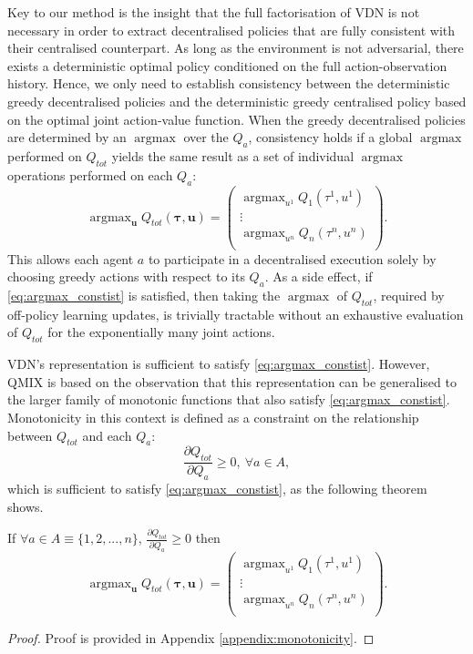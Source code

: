 \documentclass[twoside,11pt]{article}
\DeclareMathOperator*{\argmax}{argmax}
\begin{document}
Key to our method is the insight that the full factorisation of VDN is not 
necessary in order to extract decentralised policies that are fully 
consistent with their centralised counterpart.
As long as the environment is not adversarial, there exists a deterministic optimal policy conditioned 
on the full action-observation history.
Hence, we only need to establish consistency between the deterministic greedy 
decentralised policies and the deterministic greedy centralised policy based 
on the optimal joint action-value function.
When the greedy decentralised policies are determined by an $\argmax$ over the 
$Q_a$, 
consistency holds if a 
global $\argmax$ performed on $Q_{tot}$ yields the same result as a set of 
individual $\argmax$ operations performed on each $Q_a$:
\begin{equation}
\label{eq:argmax_constist}
\argmax_{\mathbf{u}}Q_{tot}(\boldsymbol{\tau}, \mathbf{u}) = 
\begin{pmatrix}
\argmax_{u^1}Q_1(\tau^1, u^1)   \\
\vdots \\
\argmax_{u^n}Q_n(\tau^n, u^n) \\
\end{pmatrix}.
\end{equation}
This allows each agent $a$ to participate in a decentralised execution solely 
by choosing greedy actions with respect to its $ Q_a $.
As a side effect, if \eqref{eq:argmax_constist} is satisfied, then taking the 
$\argmax$ of $Q_{tot}$, required by off-policy learning updates, is trivially 
tractable without an exhaustive evaluation of $Q_{tot}$ for the exponentially 
many joint actions.

VDN's representation is sufficient to satisfy \eqref{eq:argmax_constist}. 
However, QMIX is based on the observation that this representation can be 
generalised to the larger family of monotonic functions that also satisfy 
\eqref{eq:argmax_constist}.
Monotonicity in this context is defined as a constraint on the relationship 
between $Q_{tot}$ and each $Q_a$:
\begin{equation}
\label{eq:deriv-constr}
\frac{\partial Q_{tot}}{\partial Q_a}  \geq 0,~ \forall a \in A,
\end{equation}
which is sufficient
to satisfy 
\eqref{eq:argmax_constist}, as the following theorem shows.
	\begin{theorem} 
		If $\forall a \in A \equiv\{1, 2, ..., n\}$, $\frac{\partial Q_{tot}}{\partial Q_a}  \geq 0$  then
		\begin{equation}
		 \nonumber
		\argmax_{\mathbf{u}}Q_{tot}(\boldsymbol{\tau}, \mathbf{u}) = 
		\begin{pmatrix}
		\argmax_{u^1}Q_1(\tau^1, u^1)   \\
		\vdots \\
		\argmax_{u^n}Q_n(\tau^n, u^n) \\
		\end{pmatrix}.
		\end{equation}
	\end{theorem}
	\begin{proof}
	Proof is provided in Appendix \ref{appendix:monotonicity}.
	\end{proof}
\end{document}

